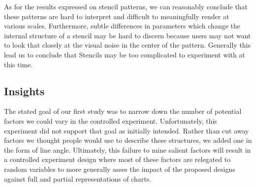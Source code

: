 As for the results expressed on stencil patterns, we can reasonably conclude that these patterns are hard to interpret and difficult to meaningfully render at various scales. Furthermore, subtle differences in parameters which change the internal structure of a stencil may be hard to discern because users may not want to look that closely at the visual noise in the center of the pattern. Generally this lead us to conclude that Stencils may be too complicated to experiment with at this time.




\subsection{Insights}

The stated goal of our first study was to narrow down the number of potential factors we could vary in the controlled experiment. Unfortunately, this experiment did not support that goal as initially intended. Rather than cut away factors we thought people would use to describe these structures, we added one in the form of line angle. Ultimately, this failure to mine salient factors will result in a controlled experiment design where most of these factors are relegated to random variables to more generally asses the impact of the proposed designs against full and partial representations of charts.

